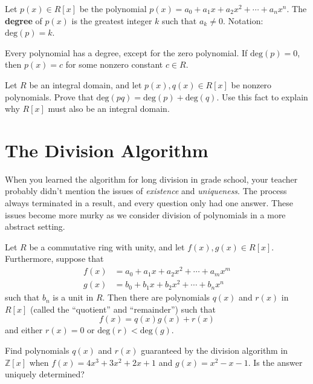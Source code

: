 \begin{definition}
Let \(p(x) \in R[x]\) be the polynomial \(p(x) = a_0 + a_1x + a_2x^2 + \cdots + a_nx^n \). The \textbf{degree} of \(p(x)\) is the greatest integer \(k\) such that \(a_k \neq 0\). Notation: \(\mbox{deg} (p) = k\).
\end{definition}

Every polynomial has a degree, except for the zero polynomial. If \(\mbox{deg}(p)=0\), then \(p(x)=c\) for some nonzero constant \(c\in R\).

\begin{problem}
Let \(R\) be an integral domain, and let \(p(x),q(x) \in R[x]\) be nonzero polynomials. Prove that \(\mbox{deg}(pq) = \mbox{deg}(p)+\mbox{deg}(q)\). Use this fact to explain why \(R[x]\) must also be an integral domain.
\end{problem}

\section{The Division Algorithm}
When you learned the algorithm for long division in grade school, your teacher probably didn't mention the issues of \emph{existence} and \emph{uniqueness}. The process always terminated in a result, and every question only had one answer. These issues become more murky as we consider division of polynomials in a more abstract setting.

\begin{theorem}
Let \(R\) be a commutative ring with unity, and let \(f(x),g(x)\in R[x]\). Furthermore, suppose that
\begin{align*}
f(x) &= a_0 + a_1x +a_2x^2 + \cdots + a_m x^m \\
g(x) &= b_0 + b_1x +b_2x^2 + \cdots + b_n x^n
\end{align*}
such that $b_n$ is a unit in \(R\). Then there are polynomials \(q(x)\) and \(r(x)\) in \(R[x]\) (called the ``quotient'' and ``remainder'') such that
\[ f(x) = q(x)g(x) + r(x) \]
and either \(r(x) = 0\) or \(\mbox{deg}(r) < \mbox{deg}(g) \).
\end{theorem}

\begin{problem}
Find polynomials \(q(x)\) and \(r(x)\) guaranteed by the division algorithm in \(\mathbb{Z}[x]\) when \(f(x) = 4x^3 + 3x^2 + 2x + 1\) and \(g(x)=x^2 - x - 1 \). Is the answer uniquely determined?
\end{problem}

